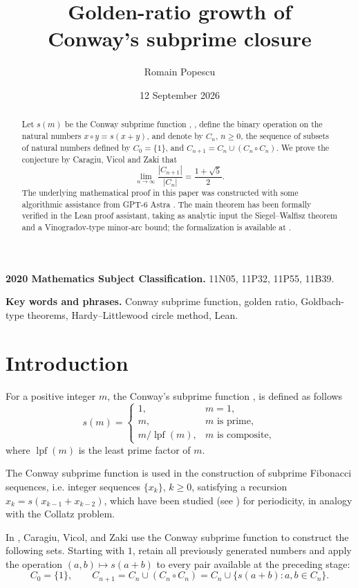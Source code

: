 \documentclass[11pt,letterpaper]{article}
\title{Golden-ratio growth of\\Conway's subprime closure}
\author{Romain Popescu}
\date{12 September 2026}
\numberwithin{equation}{section}
\theoremstyle{remark}
\DeclareMathOperator{\lpf}{lpf}
\begin{document}
\maketitle


\begin{abstract}
Let $s(m)$ be the Conway subprime function  \cite{OEIS}, \cite{Roberts}, define the binary operation on the natural numbers
$x \circ y= s(x + y)$, and denote by $C_n$, $n \ge 0$,
the sequence of subsets of natural numbers defined by $C_0 = \{1\}$,
and $C_{n+1} = C_n \cup (C_n \circ C_n)$. We prove the conjecture \cite{CVZ} by
Caragiu, Vicol and Zaki that
\[
\lim_{n\to \infty} \frac{ | C_{n+1}| }{ | C_n |}= \frac{1+\sqrt{5}}{2}.
\]
The underlying mathematical proof in this paper was constructed with some algorithmic assistance from GPT-6 Astra \cite{openai2026astra}.
The main theorem has been formally verified in the Lean proof assistant, taking as analytic input the Siegel--Walfisz theorem and a Vinogradov-type minor-arc bound; the formalization is available at \cite{Github}.
\end{abstract}

\noindent\textbf{2020 Mathematics Subject Classification.}
11N05, 11P32, 11P55, 11B39.

\noindent\textbf{Key words and phrases.}
Conway subprime function, golden ratio, Goldbach-type theorems, Hardy--Littlewood circle method, Lean.

\section{Introduction}

For a positive integer $m$, the Conway's subprime function \cite{OEIS}, \cite{Roberts} is defined as follows
\[
 s(m)=
 \begin{cases}
  1,&m=1,\\
  m,&m\text{ is prime},\\
  m/\lpf(m),&m\text{ is composite},
 \end{cases}
\]
where $\lpf(m)$ is the least prime factor of $m$. 

The Conway subprime function is used in the construction of  subprime Fibonacci sequences, i.e. integer
sequences $\{x_k\}$, $k\ge 0$,  satisfying a recursion $x_k = s (x_{k-1}+x_{k-2})$,
which have been studied (see \cite{GuyKhovanovaSalazar2014})
for periodicity, in analogy with the Collatz problem.


In  \cite{CVZ}, Caragiu, Vicol, and Zaki  use the Conway subprime function to construct the following sets.
Starting with $1$, retain all previously generated numbers and apply the operation $(a,b)\mapsto s(a+b)$
to every pair available at the preceding stage:
\begin{equation}\label{eq:closure}
 C_0=\{1\},\qquad
 C_{n+1}=C_n \cup (C_n \circ C_n) = C_n\cup\{s(a+b):a,b\in C_n\}.
\end{equation}
\end{document}

